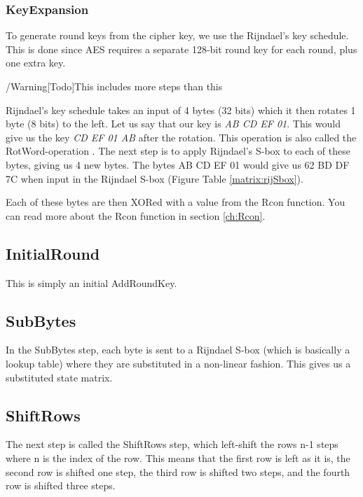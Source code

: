 \subsubsection{KeyExpansion}
To generate round keys from the cipher key, we use the Rijndael's key schedule. 
This is done since AES requires a separate 128-bit round key for each round, 
plus one extra key.

/Warning[Todo]{This includes more steps than this} 

Rijndael's key schedule takes an input of 4 bytes (32 bits) which it then 
rotates 1 byte (8 bits) to the left. Let us say that our key is 
\emph{AB CD EF 01}. This would give us the key \emph{CD EF 01 AB} after the 
rotation. This operation is also called the RotWord-operation 
\citep[p. 107]{Stinson:2006}. The next step is to apply Rijndael's S-box to 
each of these bytes, giving us 4 new bytes. The bytes {AB CD EF 01} would give 
us {62 BD DF 7C} when input in the Rijndael S-box (Figure Table 
\ref{matrix:rijSbox}).

Each of these bytes are then XORed with a value from the Rcon function. You
 can read more about the Rcon function in section \ref{ch:Rcon}.

\subsection{InitialRound}
This is simply an initial AddRoundKey.

\subsection{SubBytes}
In the SubBytes step, each byte is sent to a Rijndael S-box (which is basically
 a lookup table) where they are substituted in a non-linear fashion. This gives 
us a substituted state matrix.

\subsection{ShiftRows}
The next step is called the ShiftRows step, which left-shift the rows n-1 
steps where n is the index of the row. This means that the first row is left 
as it is, the second row is shifted one step, the third row is shifted two 
steps, and the fourth row is shifted three steps.

